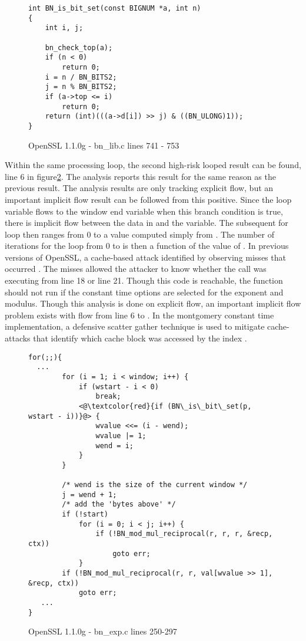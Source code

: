 \begin{figure}[h!]
\begin{lstlisting}
int BN_is_bit_set(const BIGNUM *a, int n)
{
    int i, j;

    bn_check_top(a);
    if (n < 0)
        return 0;
    i = n / BN_BITS2;
    j = n % BN_BITS2;
    if (a->top <= i)
        return 0;
    return (int)(((a->d[i]) >> j) & ((BN_ULONG)1));
}
\end{lstlisting}
\caption{OpenSSL 1.1.0g - bn\_lib.c lines 741 - 753}
\label{code:bn-isbitset}
\end{figure}

Within the same processing loop, the second high-risk looped result can be
found, line 6 in figure\ref{code:bn-recp-hi2}. The analysis reports this result
for the same reason as the previous result. The analysis results are only
tracking explicit flow, but an important implicit flow result can be followed
from this positive. Since the loop variable  flows to the window end
variable  when this branch condition is true, there is implicit
flow between the data in  and the  variable. The
subsequent for loop then ranges from 0 to  a value computed simply
from . The number of iterations for the loop from 0 to 
is then a function of the value of . In previous versions of OpenSSL,
a cache-based attack identified by observing misses that occurred
\cite{percival2005cache}. The misses allowed the attacker to know whether the
 call was executing from line 18 or line 21. Though this code is
reachable, the function should not run if the constant time options are selected
for the exponent and modulus. Though this analysis is done on explicit flow, an
important implicit flow problem exists with flow from line 6 to
. In the montgomery constant time implementation, a defensive
scatter gather technique is used to mitigate cache-attacks that identify which
cache block was accessed by the index 
\cite{cryptoeprint:2011:239,DBLP:journals/corr/DoychevK16}.


\begin{figure}[h!tpb]
\begin{lstlisting}
for(;;){
  ...
        for (i = 1; i < window; i++) {
            if (wstart - i < 0)
                break;
            <@\textcolor{red}{if (BN\_is\_bit\_set(p, wstart - i))}@> {
                wvalue <<= (i - wend);
                wvalue |= 1;
                wend = i;
            }
        }

        /* wend is the size of the current window */
        j = wend + 1;
        /* add the 'bytes above' */
        if (!start)
            for (i = 0; i < j; i++) {
                if (!BN_mod_mul_reciprocal(r, r, r, &recp, ctx))
                    goto err;
            }
        if (!BN_mod_mul_reciprocal(r, r, val[wvalue >> 1], &recp, ctx))
            goto err;
   ...
}
\end{lstlisting}
\caption{OpenSSL 1.1.0g - bn\_exp.c lines 250-297}
\label{code:bn-recp-hi2}
\end{figure}

